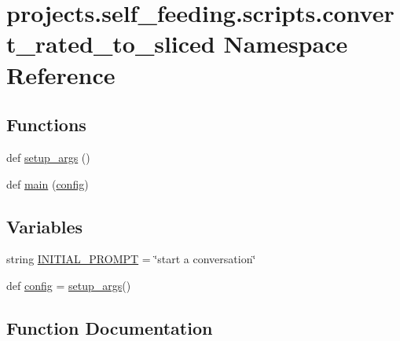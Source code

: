 \hypertarget{namespaceprojects_1_1self__feeding_1_1scripts_1_1convert__rated__to__sliced}{}\section{projects.\+self\+\_\+feeding.\+scripts.\+convert\+\_\+rated\+\_\+to\+\_\+sliced Namespace Reference}
\label{namespaceprojects_1_1self__feeding_1_1scripts_1_1convert__rated__to__sliced}
\subsection*{Functions}
\begin{DoxyCompactItemize}
\item 
def \hyperlink{namespaceprojects_1_1self__feeding_1_1scripts_1_1convert__rated__to__sliced_ae468e6330f1daa2e0ec2408e5049e097}{setup\+\_\+args} ()
\item 
def \hyperlink{namespaceprojects_1_1self__feeding_1_1scripts_1_1convert__rated__to__sliced_a818b0c6970270ed0a9a00c99e20faefd}{main} (\hyperlink{namespaceprojects_1_1self__feeding_1_1scripts_1_1convert__rated__to__sliced_a50446686af692aa6483c3c72bcf433a9}{config})
\end{DoxyCompactItemize}
\subsection*{Variables}
\begin{DoxyCompactItemize}
\item 
string \hyperlink{namespaceprojects_1_1self__feeding_1_1scripts_1_1convert__rated__to__sliced_ac792e86abebb6d765b893b0c11e9f1d0}{I\+N\+I\+T\+I\+A\+L\+\_\+\+P\+R\+O\+M\+PT} = \char`\"{}start a conversation\char`\"{}
\item 
def \hyperlink{namespaceprojects_1_1self__feeding_1_1scripts_1_1convert__rated__to__sliced_a50446686af692aa6483c3c72bcf433a9}{config} = \hyperlink{namespaceprojects_1_1self__feeding_1_1scripts_1_1convert__rated__to__sliced_ae468e6330f1daa2e0ec2408e5049e097}{setup\+\_\+args}()
\end{DoxyCompactItemize}


\subsection{Function Documentation}
\mbox{\label{namespaceprojects_1_1self__feeding_1_1scripts_1_1convert__rated__to__sliced_a818b0c6970270ed0a9a00c99e20faefd}} 
